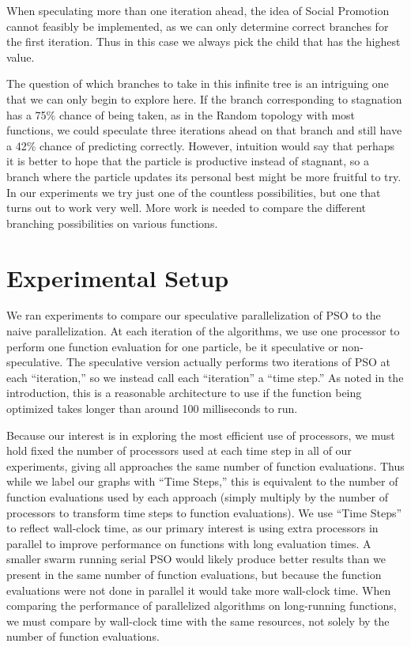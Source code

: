 \documentclass[smallcondensed]{svjour3}
\begin{document}
When speculating more than one iteration ahead, the idea of Social Promotion
cannot feasibly be implemented, as we can only determine correct branches for
the first iteration.  Thus in this case we always pick the child that has the
highest value.

The question of which branches to take in this infinite tree is an intriguing
one that we can only begin to explore here.  If the branch corresponding to
stagnation has a 75\% chance of being taken, as in the Random topology with
most functions, we could speculate three iterations ahead on that branch and
still have a 42\% chance of predicting correctly.  However, intuition would say
that perhaps it is better to hope that the particle is productive instead of
stagnant, so a branch where the particle updates its personal best might be
more fruitful to try.  In our experiments we try just one of the countless
possibilities, but one that turns out to work very well.  More work is needed
to compare the different branching possibilities on various functions.

\section{Experimental Setup}
\label{sec:setup}

We ran experiments to compare our speculative parallelization of PSO to the
naive parallelization.  At each iteration of the algorithms, we use one
processor to perform one function evaluation for one particle, be it
speculative or non-speculative.  The speculative version actually performs two
iterations of PSO at each ``iteration,'' so we instead call each ``iteration''
a ``time step.''  As noted in the introduction, this is a reasonable
architecture to use if the function being optimized takes longer than around
100 milliseconds to run.

Because our interest is in exploring the most efficient use of processors, we
must hold fixed the number of processors used at each time step in all of our
experiments, giving all approaches the same number of function evaluations.
Thus while we label our graphs with ``Time Steps,'' this is equivalent to the
number of function evaluations used by each approach (simply multiply by the
number of processors to transform time steps to function evaluations).  We use
``Time Steps'' to reflect wall-clock time, as our primary interest is using
extra processors in parallel to improve performance on functions with long
evaluation times.  A smaller swarm running serial PSO would likely produce
better results than we present in the same number of function evaluations, but
because the function evaluations were not done in parallel it would take more
wall-clock time.  When comparing the performance of parallelized algorithms on
long-running functions, we must compare by wall-clock time with the same
resources, not solely by the number of function evaluations.
\end{document}
